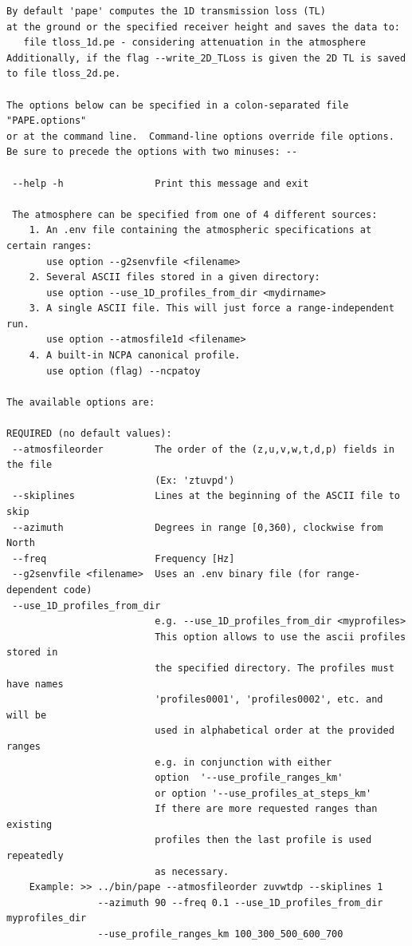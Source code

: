 \begin{verbatim}
By default 'pape' computes the 1D transmission loss (TL)
at the ground or the specified receiver height and saves the data to:
   file tloss_1d.pe - considering attenuation in the atmosphere
Additionally, if the flag --write_2D_TLoss is given the 2D TL is saved 
to file tloss_2d.pe.

The options below can be specified in a colon-separated file "PAPE.options" 
or at the command line.  Command-line options override file options.
Be sure to precede the options with two minuses: --

 --help -h                Print this message and exit

 The atmosphere can be specified from one of 4 different sources:
    1. An .env file containing the atmospheric specifications at certain ranges:
       use option --g2senvfile <filename>
    2. Several ASCII files stored in a given directory:
       use option --use_1D_profiles_from_dir <mydirname>
    3. A single ASCII file. This will just force a range-independent run.
       use option --atmosfile1d <filename>
    4. A built-in NCPA canonical profile.
       use option (flag) --ncpatoy

The available options are:

REQUIRED (no default values):
 --atmosfileorder         The order of the (z,u,v,w,t,d,p) fields in the file
                          (Ex: 'ztuvpd')
 --skiplines              Lines at the beginning of the ASCII file to skip
 --azimuth                Degrees in range [0,360), clockwise from North
 --freq                   Frequency [Hz]
 --g2senvfile <filename>  Uses an .env binary file (for range-dependent code)
 --use_1D_profiles_from_dir
                          e.g. --use_1D_profiles_from_dir <myprofiles>
                          This option allows to use the ascii profiles stored in
                          the specified directory. The profiles must have names
                          'profiles0001', 'profiles0002', etc. and will be
                          used in alphabetical order at the provided ranges
                          e.g. in conjunction with either
                          option  '--use_profile_ranges_km' 
                          or option '--use_profiles_at_steps_km'
                          If there are more requested ranges than existing
                          profiles then the last profile is used repeatedly
                          as necessary.
    Example: >> ../bin/pape --atmosfileorder zuvwtdp --skiplines 1
                --azimuth 90 --freq 0.1 --use_1D_profiles_from_dir myprofiles_dir
                --use_profile_ranges_km 100_300_500_600_700


\end{verbatim}
